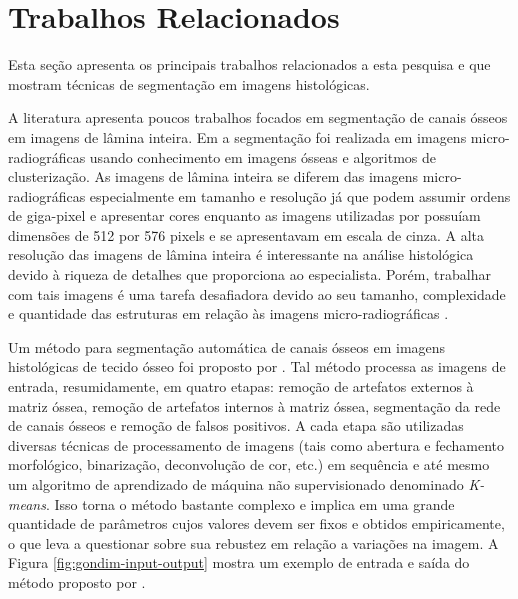 \section{Trabalhos Relacionados}
Esta seção apresenta os principais trabalhos relacionados a esta pesquisa e que mostram técnicas de segmentação em imagens histológicas.

A literatura apresenta poucos trabalhos focados em segmentação de canais ósseos em imagens de lâmina inteira. Em \cite{liu1999bone} a segmentação foi realizada em imagens micro-radiográficas usando conhecimento em imagens ósseas e algoritmos de clusterização. As imagens de lâmina inteira se diferem das imagens micro-radiográficas especialmente em tamanho e resolução já que podem assumir ordens de giga-pixel e apresentar cores enquanto as imagens utilizadas por \cite{liu1999bone} possuíam dimensões de 512 por 576 pixels e se apresentavam em escala de cinza. A alta resolução das imagens de lâmina inteira é interessante na análise histológica devido à riqueza de detalhes que proporciona ao especialista. Porém, trabalhar com tais imagens é uma tarefa desafiadora devido ao seu tamanho, complexidade e quantidade das estruturas em relação às imagens micro-radiográficas \cite{gondim2021automatic}. 


Um método para segmentação automática de canais ósseos em imagens histológicas de tecido ósseo foi proposto por \cite{gondim2021automatic}. 
Tal método processa as imagens de entrada, resumidamente, em quatro etapas: remoção de artefatos externos à matriz óssea, remoção de artefatos internos à matriz óssea, segmentação da rede de canais ósseos e remoção de falsos positivos. A cada etapa são utilizadas diversas técnicas de processamento de imagens (tais como abertura e fechamento morfológico, binarização, deconvolução de cor, etc.) em sequência e até mesmo um algoritmo de aprendizado de máquina não supervisionado denominado \textit{K-means}. Isso torna o método bastante complexo e implica em uma grande quantidade de parâmetros cujos valores devem ser fixos e obtidos empiricamente, o que leva a questionar sobre sua rebustez em relação a variações na imagem. A Figura \ref{fig:gondim-input-output} mostra um exemplo de entrada e saída do método proposto por \cite{gondim2021automatic}.

